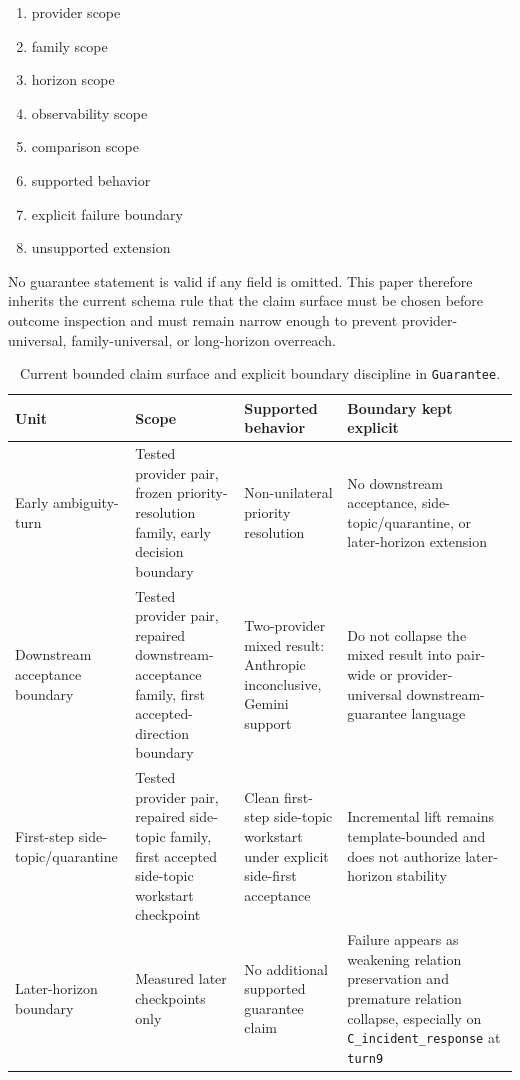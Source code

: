 \documentclass[11pt]{article}
\begin{document}
\begin{enumerate}
\item provider scope
\item family scope
\item horizon scope
\item observability scope
\item comparison scope
\item supported behavior
\item explicit failure boundary
\item unsupported extension
\end{enumerate}

No guarantee statement is valid if any field is omitted. This paper therefore
inherits the current schema rule that the claim surface must be chosen before
outcome inspection and must remain narrow enough to prevent provider-universal,
family-universal, or long-horizon overreach.

\begin{table}[ht]
\centering
\begin{tabular}{|p{}|p{}|p{}|p{}|}
\hline
\textbf{Unit} & \textbf{Scope} & \textbf{Supported behavior} & \textbf{Boundary kept explicit} \\
\hline
Early ambiguity-turn & Tested provider pair, frozen priority-resolution family, early decision boundary & Non-unilateral priority resolution & No downstream acceptance, side-topic/quarantine, or later-horizon extension \\
\hline
Downstream acceptance boundary & Tested provider pair, repaired downstream-acceptance family, first accepted-direction boundary & Two-provider mixed result: Anthropic inconclusive, Gemini support & Do not collapse the mixed result into pair-wide or provider-universal downstream-guarantee language \\
\hline
First-step side-topic/quarantine & Tested provider pair, repaired side-topic family, first accepted side-topic workstart checkpoint & Clean first-step side-topic workstart under explicit side-first acceptance & Incremental lift remains template-bounded and does not authorize later-horizon stability \\
\hline
Later-horizon boundary & Measured later checkpoints only & No additional supported guarantee claim & Failure appears as weakening relation preservation and premature relation collapse, especially on \texttt{C\_incident\_response} at \texttt{turn9} \\
\hline
\end{tabular}
\caption{Current bounded claim surface and explicit boundary discipline in
\texttt{Guarantee}.}
\end{table}
\end{document}
